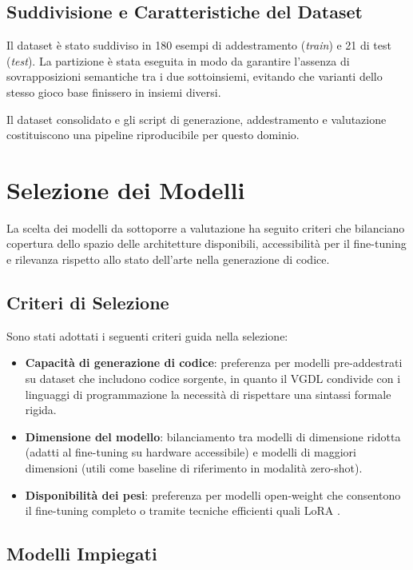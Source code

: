 \documentclass[final,5p,times,twocolumn]{elsarticle}
\begin{document}
\subsection{Suddivisione e Caratteristiche del Dataset}

Il dataset è stato suddiviso in 180 esempi di addestramento (\textit{train}) e 21 di test (\textit{test}). La partizione è stata eseguita in modo da garantire l'assenza di sovrapposizioni semantiche tra i due sottoinsiemi, evitando che varianti dello stesso gioco base finissero in insiemi diversi.

Il dataset consolidato e gli script di generazione, addestramento e valutazione costituiscono una pipeline riproducibile per questo dominio.

\section{Selezione dei Modelli}

La scelta dei modelli da sottoporre a valutazione ha seguito criteri che bilanciano copertura dello spazio delle architetture disponibili, accessibilità per il fine-tuning e rilevanza rispetto allo stato dell'arte nella generazione di codice.

\subsection{Criteri di Selezione}

Sono stati adottati i seguenti criteri guida nella selezione:
\begin{itemize}
  \item \textbf{Capacità di generazione di codice}: preferenza per modelli pre-addestrati su dataset che includono codice sorgente, in quanto il VGDL condivide con i linguaggi di programmazione la necessità di rispettare una sintassi formale rigida.
  \item \textbf{Dimensione del modello}: bilanciamento tra modelli di dimensione ridotta (adatti al fine-tuning su hardware accessibile) e modelli di maggiori dimensioni (utili come baseline di riferimento in modalità zero-shot).
  \item \textbf{Disponibilità dei pesi}: preferenza per modelli open-weight che consentono il fine-tuning completo o tramite tecniche efficienti quali LoRA \citep{hu2022lora}.
\end{itemize}


\subsection{Modelli Impiegati}
\end{document}
